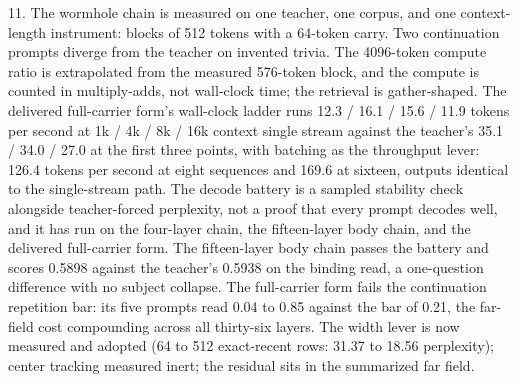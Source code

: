 \documentclass[11pt]{article}
\begin{document}
11. The wormhole chain is measured on one teacher, one corpus,
    and one context-length instrument: blocks of 512 tokens with
    a 64-token carry. Two continuation prompts diverge from the
    teacher on invented trivia. The 4096-token compute ratio is
    extrapolated from the measured 576-token block, and the
    compute is counted in multiply-adds, not wall-clock time; the
    retrieval is gather-shaped. The delivered full-carrier form's
    wall-clock ladder runs 12.3 / 16.1 / 15.6 / 11.9 tokens per
    second at 1k / 4k / 8k / 16k context single stream against the
    teacher's 35.1 / 34.0 / 27.0 at the first three points, with
    batching as the throughput lever: 126.4 tokens per second at
    eight sequences and 169.6 at sixteen, outputs identical to
    the single-stream path. The decode
    battery is a sampled stability check alongside teacher-forced
    perplexity, not a proof that every prompt decodes well, and it
    has run on the four-layer chain, the fifteen-layer body
    chain, and the delivered full-carrier form. The fifteen-layer body chain passes the battery and
    scores 0.5898 against the teacher's 0.5938 on the binding
    read, a one-question difference with no subject collapse.
    The full-carrier form fails the continuation repetition bar:
    its five prompts read 0.04 to 0.85 against the bar of 0.21,
    the far-field cost compounding across all thirty-six layers.
    The width lever is now measured and adopted (64 to 512
    exact-recent rows: 31.37 to 18.56 perplexity); center
    tracking measured inert; the residual sits in the summarized
    far field.
\end{document}
